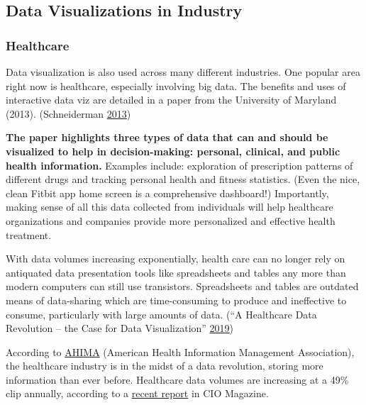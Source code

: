 \documentclass[]{book}
\begin{document}
\hypertarget{data-visualizations-in-industry}{%
\subsection{Data Visualizations in Industry}\label{data-visualizations-in-industry}}

\hypertarget{healthcare}{%
\subsubsection{Healthcare}\label{healthcare}}

Data visualization is also used across many different industries. One popular area right now is healthcare, especially involving big data. The benefits and uses of interactive data viz are detailed in a paper from the University of Maryland (2013). (Schneiderman \protect\hyperlink{ref-data_viz_healthcare}{2013})

\textbf{The paper highlights three types of data that can and should be visualized to help in decision-making: personal, clinical, and public health information.} Examples include: exploration of prescription patterns of different drugs and tracking personal health and fitness statistics. (Even the nice, clean Fitbit app home screen is a comprehensive dashboard!) Importantly, making sense of all this data collected from individuals will help healthcare organizations and companies provide more personalized and effective health treatment.

With data volumes increasing exponentially, health care can no longer rely on antiquated data presentation tools like spreadsheets and tables any more than modern computers can still use transistors. Spreadsheets and tables are outdated means of data-sharing which are time-consuming to produce and ineffective to consume, particularly with large amounts of data. (``A Healthcare Data Revolution -- the Case for Data Visualization'' \protect\hyperlink{ref-healthcare_rev}{2019})

According to \href{https://journal.ahima.org/2015/03/18/you-say-you-want-a-data-revolution/}{AHIMA} (American Health Information Management Association), the healthcare industry is in the midst of a data revolution, storing more information than ever before.
Healthcare data volumes are increasing at a 49\% clip annually, according to a \href{https://www.cio.com/article/2860072/how-cios-can-prepare-for-healthcare-data-tsunami.html}{recent report} in CIO Magazine.
\end{document}
